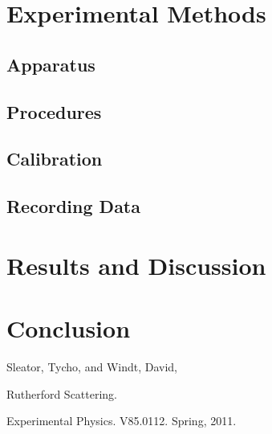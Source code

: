 \section{Experimental Methods}
\subsection{Apparatus}
\subsection{Procedures}
\subsection{Calibration}
\subsection{Recording Data}


\section{Results and Discussion}

\section{Conclusion}


\begin{thebibliography}{99}
Sleator, Tycho, and Windt, David, \begin{em}Rutherford Scattering. \end{em}Experimental Physics. V85.0112. Spring, 2011.
\end{thebibliography}

